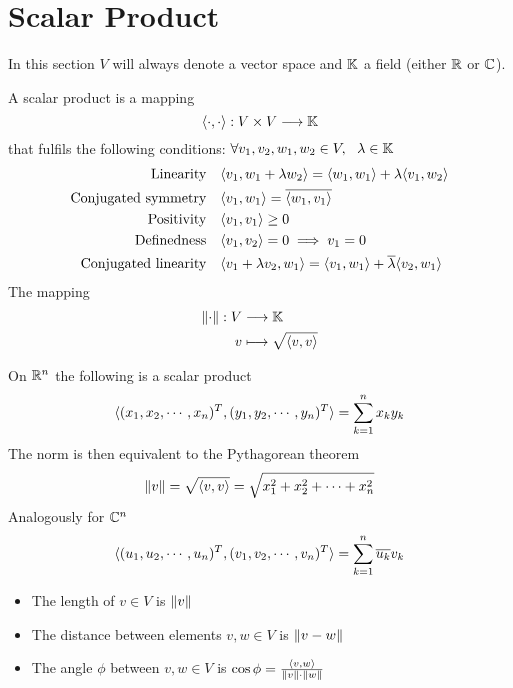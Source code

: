 \documentclass[../../script.tex]{subfiles}
\begin{document}
\section{Scalar Product}

In this section $V$ will always denote a vector space and $\field$ a field (either $\realn$ or $\cmpln$).

\begin{defi}
    A scalar product is a mapping
    \[
        \innerproduct{\cdot}{\cdot}: V \times V \longrightarrow \field  
    \]
    that fulfils the following conditions:
    $\forall v_1, v_2, w_1, w_2 \in V, ~~\lambda \in \field$
    \begin{align*}
        \text{Linearity} && &\innerproduct{v_1}{w_1 + \lambda w_2} = \innerproduct{w_1}{w_1} + \lambda\innerproduct{v_1}{w_2} \\
        \text{Conjugated symmetry} && &\innerproduct{v_1}{w_1} = \conj{\innerproduct{w_1}{v_1}} \\
        \text{Positivity} && &\innerproduct{v_1}{v_1} \ge 0 \\
        \text{Definedness} && &\innerproduct{v_1}{v_2} = 0 \implies v_1 = 0 \\
        \text{Conjugated linearity} && &\innerproduct{v_1 + \lambda v_2}{w_1} = \innerproduct{v_1}{w_1} + \conj{\lambda} \innerproduct{v_2}{w_1} \\
    \end{align*}
    The mapping
    \begin{align*}
        \norm{\cdot}: V &\longrightarrow \field \\
        v &\longmapsto \sqrt{\innerproduct{v}{v}}
    \end{align*}
\end{defi}

\begin{eg}
    On $\realn^n$ the following is a scalar product
    \[
        \innerproduct{(x_1, x_2, \cdots, x_n)^T}{(y_1, y_2, \cdots, y_n)^T} = \series[n]{k} x_ky_k
    \]
    The norm is then equivalent to the Pythagorean theorem
    \[
        \norm{v} = \sqrt{\innerproduct{v}{v}} = \sqrt{x_1^2 + x_2^2 + \cdots + x_n^2}
    \]
    Analogously for $\cmpln^n$
    \[
        \innerproduct{(u_1, u_2, \cdots, u_n)^T}{(v_1, v_2, \cdots, v_n)^T} = \series[n]{k} \conj{u_k}v_k
    \]
\end{eg}

\begin{rem}
\begin{itemize}
    \item The length of $v \in V$ is $\norm{v}$
    \item The distance between elements $v, w \in V$ is $\norm{v-w}$
    \item The angle $\phi$ between $v, w \in V$ is $\cos \phi = \frac{\innerproduct{v}{w}}{\norm{v}\cdot\norm{w}}$
\end{itemize}
\end{rem}
\end{document}

